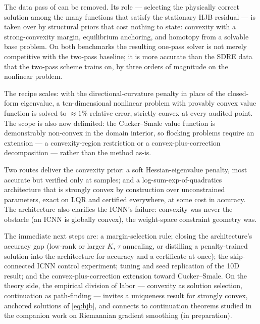 \documentclass[11pt,a4paper]{article}
\begin{document}
The data pass of \cite{borovykh2022data} can be removed. Its role ---
selecting the physically correct solution among the many functions that
satisfy the stationary HJB residual --- is taken over by structural priors
that cost nothing to state: convexity with a strong-convexity margin,
equilibrium anchoring, and homotopy from a solvable base problem. On both
benchmarks the resulting one-pass solver is not merely competitive with the
two-pass baseline; it is more accurate than the SDRE data that the two-pass
scheme trains on, by three orders of magnitude on the nonlinear problem.

The recipe scales: with the directional-curvature penalty in place of the
closed-form eigenvalue, a ten-dimensional nonlinear problem with provably
convex value function is solved to $\approx 1\%$ relative error, strictly
convex at every audited point. The scope is also now delimited: the
Cucker--Smale value function is demonstrably non-convex in the domain
interior, so flocking problems require an extension --- a convexity-region
restriction or a convex-plus-correction decomposition --- rather than the
method as-is.

Two routes deliver the convexity prior: a soft Hessian-eigenvalue penalty,
most accurate but verified only at samples; and a log-sum-exp-of-quadratics
architecture that is strongly convex by construction over unconstrained
parameters, exact on LQR and certified everywhere, at some cost in accuracy.
The architecture also clarifies the ICNN's failure: convexity was never the
obstacle (an ICNN is globally convex), the weight-space constraint geometry
was.

The immediate next steps are: a margin-selection rule; closing the
architecture's accuracy gap (low-rank or larger $K$, $\tau$ annealing, or
distilling a penalty-trained solution into the architecture for accuracy and
a certificate at once); the skip-connected ICNN control experiment; tuning
and seed replication of the 10D result; and the convex-plus-correction
extension toward Cucker--Smale. On the theory side, the empirical division of
labor
--- convexity as solution selection, continuation as path-finding ---
invites a uniqueness result for strongly convex, anchored solutions of
\eqref{eq:hjb}, and connects to continuation theorems studied in the
companion work on Riemannian gradient smoothing (in preparation).
\end{document}

